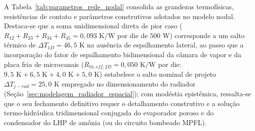A Tabela~\ref{tab:parametros_rede_nodal} consolida as grandezas termofísicas, resistências de contato e parâmetros construtivos adotados no modelo nodal. Destaca-se que a soma unidimensional direta de pior caso ($R_{12}+R_{23}+R_{34}+R_{45} = 0{,}093\text{ K/W}$ por die de $500\text{ W}$) corresponde a um salto térmico de $\Delta T_{1D} = 46{,}5\text{ K}$ na ausência de espalhamento lateral, ao passo que a incorporação do fator de espalhamento bidimensional da câmara de vapor e da placa fria de microcanais ($R_{th,eff,2D} = 0{,}050\text{ K/W}$ por die: $9{,}5\text{ K} + 6{,}5\text{ K} + 4{,}0\text{ K} + 5{,}0\text{ K}$) estabelece o salto nominal de projeto $\Delta T_{j-rad} = 25{,}0\text{ K}$ empregado no dimensionamento do radiador (Seção~\ref{sec:modelagem_radiador_espacial}); com modéstia epistêmica, ressalta-se que o seu fechamento definitivo requer o detalhamento construtivo e a solução termo-hidráulica tridimensional conjugada do evaporador poroso e do condensador do LHP de amônia (ou do circuito bombeado MPFL).

